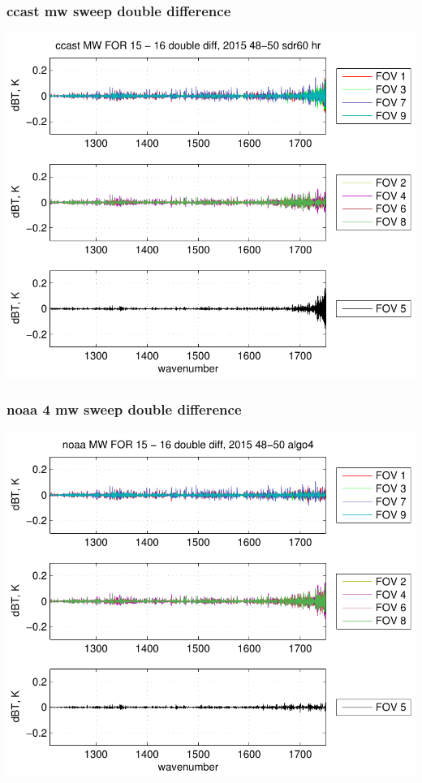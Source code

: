\documentclass[11pt]{beamer}
\begin{document}
\begin{frame}
\frametitle{ccast mw sweep double difference}
\begin{center}
  \includegraphics[scale=0.7]{figures/ccast_MW_sfil_2015_48-50_sdr60_hr.pdf}
\end{center}
\end{frame}
\begin{frame}
\frametitle{noaa 4 mw sweep double difference}
\begin{center}
  \includegraphics[scale=0.7]{figures/noaa_MW_sfil_2015_48-50_algo4.pdf}
\end{center}
\end{frame}
\end{document}
